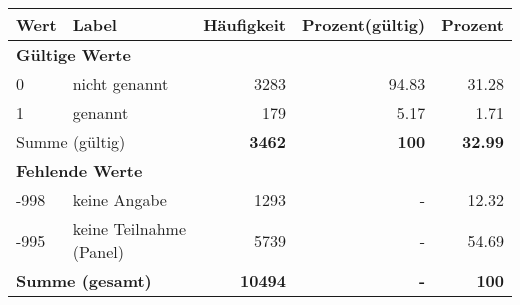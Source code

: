      \begin{longtable}{lXrrr}
     \toprule
     \textbf{Wert} & \textbf{Label} & \textbf{Häufigkeit} & \textbf{Prozent(gültig)} & \textbf{Prozent} \\
     \endhead
     \midrule
     \multicolumn{5}{l}{\textbf{Gültige Werte}}\\

     0 &
     \multicolumn{1}{X}{ nicht genannt   } &


       \num{3283} &
       \num[round-mode=places,round-precision=2]{94,83} &
         \num[round-mode=places,round-precision=2]{31,28} \\

     1 &
     \multicolumn{1}{X}{ genannt   } &


       \num{179} &
       \num[round-mode=places,round-precision=2]{5,17} &
         \num[round-mode=places,round-precision=2]{1,71} \\
     \midrule
     \multicolumn{2}{l}{Summe (gültig)} &
       \textbf{\num{3462}} &
     \textbf{100} &
       \textbf{\num[round-mode=places,round-precision=2]{32,99}} \\
     \multicolumn{5}{l}{\textbf{Fehlende Werte}}\\
       -998 &
       keine Angabe &
         \num{1293} &
        - &
         \num[round-mode=places,round-precision=2]{12,32} \\
       -995 &
       keine Teilnahme (Panel) &
         \num{5739} &
        - &
         \num[round-mode=places,round-precision=2]{54,69} \\
     \midrule
     \multicolumn{2}{l}{\textbf{Summe (gesamt)}} &
          \textbf{\num{10494}} &
        \textbf{-} &
        \textbf{100} \\
     \bottomrule
     \end{longtable}
     
